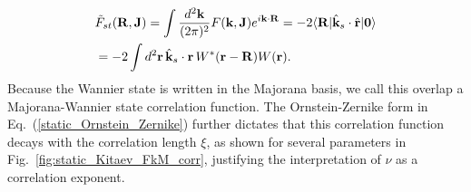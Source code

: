 \documentclass[aps,prb,twocolumn,superscriptaddress,groupedaddress]{revtex4}
\begin{document}
%
\begin{eqnarray}
&\tilde{F}_{st}({\bf R},{\bf J})=\int\frac{d^{2}{\bf k}}{(2\pi)^{2}}F({\bf k},{\bf J})e^{i{\bf k\cdot R}}=-2\langle {\bf R}|{\hat{\bf k}}_{s}\cdot{\hat{\bf r}}|{\bf 0}\rangle
\nonumber \\
&=-2\int d^{2}{\bf r}\,{\hat{\bf k}}_{s}\cdot{\bf r}\,W^{\ast}({\bf r-R})W({\bf r}).
\end{eqnarray}
%
Because the Wannier state is written in the Majorana basis, we call this overlap a Majorana-Wannier state correlation function. 
The Ornstein-Zernike form in Eq.~(\ref{static_Ornstein_Zernike}) further dictates that this correlation function decays with the correlation length $\xi$, as shown for several parameters in Fig.~\ref{fig:static_Kitaev_FkM_corr}, justifying the interpretation of $\nu$  as a correlation exponent.
\end{document}
